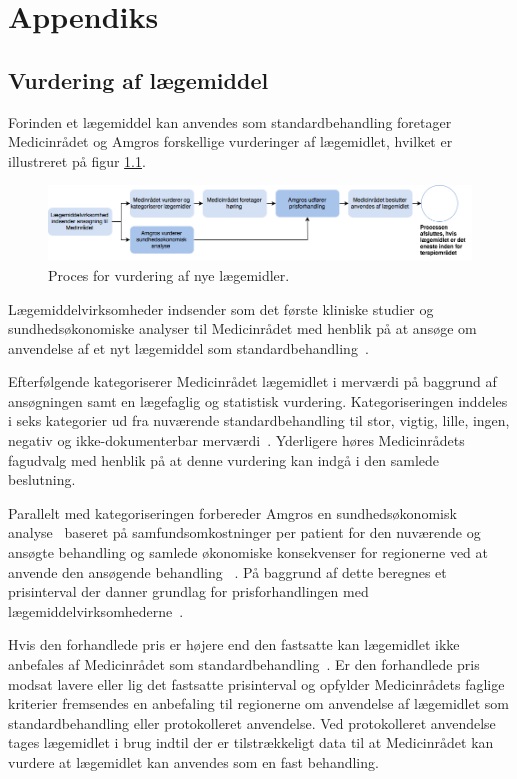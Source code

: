 \chapter{Appendiks} \label{cha:AppA}
\section{Vurdering af lægemiddel}
Forinden et lægemiddel kan anvendes som standardbehandling foretager Medicinrådet og Amgros forskellige vurderinger af lægemidlet, hvilket er illustreret på figur \ref{fig:Udbud}.
 
\begin{figure}[H]\centering
	\includegraphics[width=1\textwidth]{billeder/Udbud.png} 
	\caption{Proces for vurdering af nye lægemidler.~\citep{DanskeRegioner2016}}
	\label{fig:Udbud}  
\end{figure}

Lægemiddelvirksomheder indsender som det første kliniske studier og sundhedsøkonomiske analyser til Medicinrådet med henblik på at ansøge om anvendelse af et nyt lægemiddel som standardbehandling~\citep{DanskeRegioner2016}. 

Efterfølgende kategoriserer Medicinrådet lægemidlet i merværdi på baggrund af ansøgningen samt en lægefaglig og statistisk vurdering.  Kategoriseringen inddeles i seks kategorier ud fra nuværende standardbehandling til stor, vigtig, lille, ingen, negativ og ikke-dokumenterbar merværdi~\citep{DanskeRegioner2016}. Yderligere høres Medicinrådets fagudvalg med henblik på at denne vurdering kan indgå i den samlede beslutning.~\citep{DanskeRegioner2016}

Parallelt med kategoriseringen forbereder Amgros en sundhedsøkonomisk analyse~\citep{DanskeRegioner2016} baseret på  samfundsomkostninger per patient for den nuværende og ansøgte behandling og samlede økonomiske konsekvenser for regionerne ved at anvende den ansøgende behandling ~\citep{Amgros2017, Amgros2017}. På baggrund af dette beregnes et prisinterval der danner grundlag for prisforhandlingen med lægemiddelvirksomhederne~\citep{DanskeRegioner2016}. 

Hvis den forhandlede pris er højere end den fastsatte kan lægemidlet ikke anbefales af Medicinrådet som standardbehandling~\citep{DanskeRegioner2016}. 
Er den forhandlede pris modsat lavere eller lig det fastsatte prisinterval og opfylder Medicinrådets faglige kriterier fremsendes en anbefaling til regionerne om anvendelse af lægemidlet som standardbehandling eller protokolleret anvendelse.
Ved protokolleret anvendelse tages lægemidlet i brug indtil der er tilstrækkeligt data til at Medicinrådet kan vurdere at lægemidlet kan anvendes som en fast behandling.~\citep{DanskeRegioner2016}

